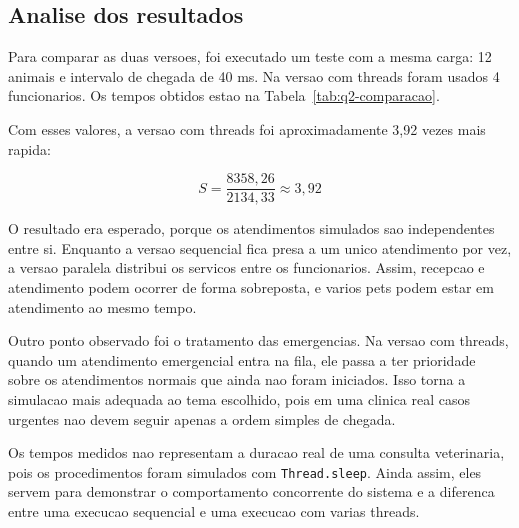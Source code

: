 \subsection{Analise dos resultados}

Para comparar as duas versoes, foi executado um teste com a mesma carga: 12 animais e intervalo de chegada de 40 ms. Na versao com threads foram usados 4 funcionarios. Os tempos obtidos estao na Tabela~\ref{tab:q2-comparacao}.

\begin{table}[H]
    \centering
    \caption{Comparacao entre a versao sequencial e a versao com threads.}
    \label{tab:q2-comparacao}
\end{table}

Com esses valores, a versao com threads foi aproximadamente 3,92 vezes mais rapida:

\[
S = \frac{8358,26}{2134,33} \approx 3,92
\]

O resultado era esperado, porque os atendimentos simulados sao independentes entre si. Enquanto a versao sequencial fica presa a um unico atendimento por vez, a versao paralela distribui os servicos entre os funcionarios. Assim, recepcao e atendimento podem ocorrer de forma sobreposta, e varios pets podem estar em atendimento ao mesmo tempo.

Outro ponto observado foi o tratamento das emergencias. Na versao com threads, quando um atendimento emergencial entra na fila, ele passa a ter prioridade sobre os atendimentos normais que ainda nao foram iniciados. Isso torna a simulacao mais adequada ao tema escolhido, pois em uma clinica real casos urgentes nao devem seguir apenas a ordem simples de chegada.

Os tempos medidos nao representam a duracao real de uma consulta veterinaria, pois os procedimentos foram simulados com \texttt{Thread.sleep}. Ainda assim, eles servem para demonstrar o comportamento concorrente do sistema e a diferenca entre uma execucao sequencial e uma execucao com varias threads.

